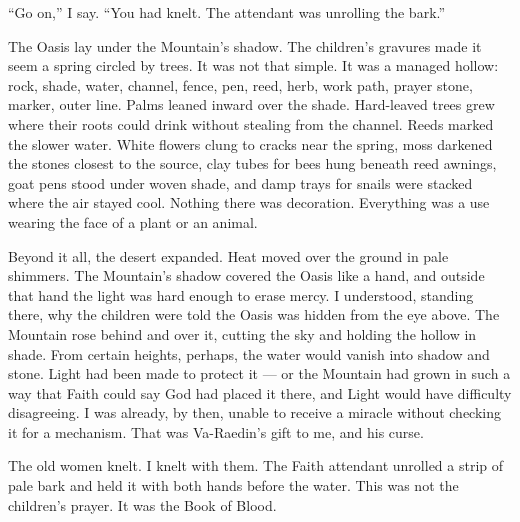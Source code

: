 ``Go on,'' I say. ``You had knelt. The attendant was unrolling the bark.''\par

\ornament

\noindent The Oasis lay under the Mountain's shadow. The children's gravures made it seem a spring circled by trees. It was not that simple. It was a managed hollow: rock, shade, water, channel, fence, pen, reed, herb, work path, prayer stone, marker, outer line. Palms leaned inward over the shade. Hard-leaved trees grew where their roots could drink without stealing from the channel. Reeds marked the slower water. White flowers clung to cracks near the spring, moss darkened the stones closest to the source, clay tubes for bees hung beneath reed awnings, goat pens stood under woven shade, and damp trays for snails were stacked where the air stayed cool. Nothing there was decoration. Everything was a use wearing the face of a plant or an animal.\par

Beyond it all, the desert expanded. Heat moved over the ground in pale shimmers. The Mountain's shadow covered the Oasis like a hand, and outside that hand the light was hard enough to erase mercy. I understood, standing there, why the children were told the Oasis was hidden from the eye above. The Mountain rose behind and over it, cutting the sky and holding the hollow in shade. From certain heights, perhaps, the water would vanish into shadow and stone. Light had been made to protect it --- or the Mountain had grown in such a way that Faith could say God had placed it there, and Light would have difficulty disagreeing. I was already, by then, unable to receive a miracle without checking it for a mechanism. That was Va-Raedin's gift to me, and his curse.\par

The old women knelt. I knelt with them. The Faith attendant unrolled a strip of pale bark and held it with both hands before the water. This was not the children's prayer. It was the Book of Blood.\par

